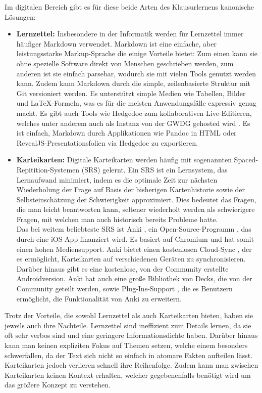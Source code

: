 \documentclass[ngerman]{article}
\begin{document}
Im digitalen Bereich gibt es für diese beide Arten des Klausurlernens kanonische Lösungen:
\begin{itemize}
  \item \textbf{Lernzettel:} Insbesondere in der Informatik werden für Lernzettel immer häufiger Markdown \cite{Markdown} verwendet. Markdown ist eine einfache, aber leistungsstarke Markup-Sprache die einige Vorteile bietet: Zum einen kann sie ohne spezielle Software direkt von Menschen geschrieben werden, zum anderen ist sie einfach parsebar, wodurch sie mit vielen Tools genutzt werden kann. Zudem kann Markdown durch die simple, zeilenbasierte Struktur mit Git versioniert werden. Es unterstützt simple Medien wie Tabellen, Bilder und \LaTeX-Formeln, was es für die meisten Anwendungsfälle expressiv genug macht. Es gibt auch Tools wie Hedgedoc \cite{HedgeDoc} zum kollaborativen Live-Editieren, welches unter anderem auch als Instanz von der GWDG gehosted wird \cite{HedgeDocGWDG}. Es ist einfach, Markdown durch Applikationen wie Pandoc \cite{Pandoc} in HTML oder RevealJS-Presentationsfolien \cite{RevealJS} via Hedgedoc zu exportieren.
  \item \textbf{Karteikarten:} Digitale Karteikarten werden häufig mit sogenannten Spaced-Repitition-Systemen (SRS) gelernt. Ein SRS ist ein Lernsystem, das Lernaufwand minimiert, indem es die optimale Zeit zur nächsten Wiederholung der Frage auf Basis der bisherigen Kartenhistorie sowie der Selbsteinschätzung der Schwierigkeit approximiert. Dies bedeutet das Fragen, die man leicht beantworten kann, seltener wiederholt werden als schwierigere Fragen, mit welchen man auch historisch bereits Probleme hatte.\\
    Das bei weitem beliebteste SRS ist Anki \cite{Anki}, ein Open-Source-Programm \cite{AnkiGithub}, das durch eine iOS-App \cite{AnkiiOS} finanziert wird. Es basiert auf Chromium \cite{QTWebEngine} und hat somit einen hohen Mediensupport. Anki bietet einen kostenlosen Cloud-Sync \cite{AnkiCloud}, der es ermöglicht, Karteikarten auf verschiedenen Geräten zu synchronisieren. Darüber hinaus gibt es eine kostenlose, von der Community erstellte Androidversion. Anki hat auch eine große Bibliothek von Decks, die von der Community geteilt werden, sowie Plug-Ins-Support \cite{AnkiPlugins}, die es Benutzern ermöglicht, die Funktionalität von Anki zu erweitern.
\end{itemize}

Trotz der Vorteile, die sowohl Lernzettel als auch Karteikarten bieten, haben sie jeweils auch ihre Nachteile. Lernzettel sind ineffizient zum Details lernen, da sie oft sehr verbos sind und eine geringere Informationsdichte haben. Darüber hinaus kann man keinen expliziten Fokus auf Themen setzen, welche einem besonders schwerfallen, da der Text sich nicht so einfach in atomare Fakten aufteilen lässt. Karteikarten jedoch verlieren schnell ihre Reihenfolge. Zudem kann man zwischen Karteikarten keinen Kontext erhalten, welcher gegebenenfalls benötigt wird um das größere Konzept zu verstehen.
\end{document}
